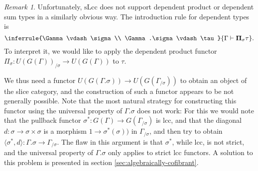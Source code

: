\documentclass[a4paper]{article}
\theoremstyle{remark}
\newtheorem{remark}[theorem]{Remark}
\theoremstyle{definition}
\begin{document}
\begin{remark}
  \label{rem:slcc-slice-problem}
  Unfortunately, $\mathrm{sLcc}$ does not support dependent product or dependent sum types in a similarly obvious way.
  The introduction rule for dependent types is
  \begin{equation}
    \inferrule
    {\Gamma \vdash \sigma \\ \Gamma.\sigma \vdash \tau}
    {\Gamma \vdash \mathbf{\Pi}_\sigma \tau}.
  \end{equation}
  To interpret it, we would like to apply the dependent product functor $\Pi_\sigma : U(G(\Gamma))_{/ \sigma} \rightarrow U(G(\Gamma))$ to $\tau$.
  
  We thus need a functor $U(G(\Gamma.\sigma)) \rightarrow U(G(\Gamma_{/ \sigma}))$ to obtain an object of the slice category, and the construction of such a functor appears to be not generally possible.
  Note that the most natural strategy for constructing this functor using the universal property of $\Gamma.\sigma$ does not work:
  For this we would note that the pullback functor $\sigma^* : G(\Gamma) \rightarrow G(\Gamma_{/ \sigma})$ is lcc, and that the diagonal $d : \sigma \rightarrow \sigma \times \sigma$ is a morphism $1 \rightarrow \sigma^*(\sigma))$ in $\Gamma_{/ \sigma}$, and then try to obtain $\langle \sigma^*, d \rangle : \Gamma.\sigma \rightarrow \Gamma_{/ \sigma}$.
  The flaw in this argument is that $\sigma^*$, while lcc, is not strict, and the universal property of $\Gamma.\sigma$ only applies to strict lcc functors.
  A solution to this problem is presented in section \ref{sec:algebraically-cofibrant}.
\end{remark}
\end{document}

